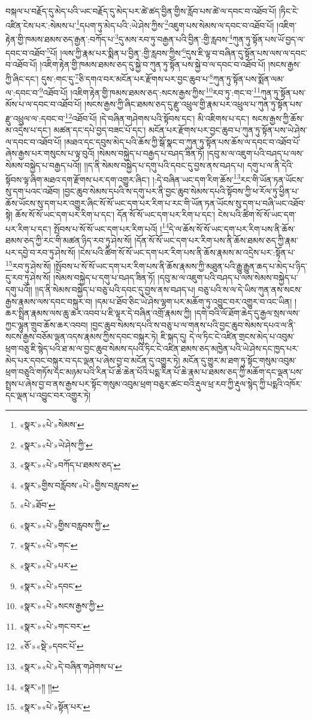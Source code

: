 བསྐལ་པ་བརྗོད་དུ་མེད་པའི་ཡང་བརྗོད་དུ་མེད་པར་ཚེ་ཚད་བྱིན་གྱིས་རློབ་པས་ཚེ་ལ་དབང་བ་འཐོབ་པོ། །ཏིང་ངེ་འཛིན་ངེས་པར་:སེམས་པ་\footnote{«སྣར་»«པེ་»སེམས་}དཔག་ཏུ་མེད་པའི་:ཡེ་ཤེས་ཀྱིས་\footnote{«སྣར་»«པེ་»ཡེ་ཤེས་ཀྱི་}འཇུག་པས་སེམས་ལ་དབང་བ་འཐོབ་པོ། །འཇིག་རྟེན་གྱི་ཁམས་ཐམས་ཅད་རྒྱན་:བཀོད་པ་\footnote{«སྣར་»«པེ་»བཀོད་པ་ཐམས་ཅད་}དུ་མས་རབ་ཏུ་བརྒྱན་པའི་བྱིན་:གྱི་རླབས་\footnote{«སྣར་»གྱིས་བརློབས་«པེ་»གྱིས་བརླབས་}ཀུན་ཏུ་སྟོན་པས་ཡོ་བྱད་ལ་དབང་བ་འཐོབ་\footnote{«པེ་»ཐོབ་}པོ། །ལས་ཀྱི་རྣམ་པར་སྨིན་པ་བྱིན་:གྱི་རླབས་ཀྱིས་\footnote{«སྣར་»«པེ་»གྱིས་བརླབས་ཀྱི་}དུས་ཇི་ལྟ་བ་བཞིན་དུ་སྟོན་པས་ལས་ལ་དབང་བ་འཐོབ་པོ། །འཇིག་རྟེན་གྱི་ཁམས་ཐམས་ཅད་དུ་སྐྱེ་བ་ཀུན་ཏུ་སྟོན་པས་སྐྱེ་བ་ལ་དབང་བ་འཐོབ་པོ། །སངས་རྒྱས་ཀྱི་ཞིང་དང་། དུས་:གང་དུ་\footnote{«སྣར་»«པེ་»གང་}ཅི་དགའ་བར་མངོན་པར་རྫོགས་པར་བྱང་ཆུབ་པ་\footnote{«སྣར་»«པེ་»པར་}ཀུན་ཏུ་སྟོན་པས་སྨོན་ལམ་ལ་:དབང་བ་\footnote{«སྣར་»«པེ་»དབང་}འཐོབ་པོ། །འཇིག་རྟེན་གྱི་ཁམས་ཐམས་ཅད་:སངས་རྒྱས་ཀྱིས་\footnote{«སྣར་»«པེ་»སངས་རྒྱས་ཀྱི་}རབ་ཏུ་:གང་བ་\footnote{«སྣར་»«པེ་»གང་བར་}ཀུན་ཏུ་སྟོན་པས་མོས་པ་ལ་དབང་བ་འཐོབ་པོ། །སངས་རྒྱས་ཀྱི་ཞིང་ཐམས་ཅད་དུ་རྫུ་འཕྲུལ་གྱི་རྣམ་པར་འཕྲུལ་པ་ཀུན་ཏུ་སྟོན་པས་རྫུ་འཕྲུལ་ལ་:དབང་བ་\footnote{«ཅོ་»«སྡེ་»དབང་པོ་}འཐོབ་པོ། །དེ་བཞིན་གཤེགས་པའི་སྟོབས་དང་། མི་འཇིགས་པ་དང་། སངས་རྒྱས་ཀྱི་ཆོས་མ་འདྲེས་པ་དང་། མཚན་དང་དཔེ་བྱད་བཟང་པོ་དང་། མངོན་པར་རྫོགས་པར་བྱང་ཆུབ་པ་ཀུན་ཏུ་སྟོན་པས་ཡེ་ཤེས་ལ་དབང་བ་འཐོབ་པོ། །མཐའ་དང་དབུས་མེད་པའི་ཆོས་ཀྱི་སྒོ་སྣང་བ་ཀུན་ཏུ་སྟོན་པས་ཆོས་ལ་དབང་བ་འཐོབ་པོ་ཞེས་རྒྱས་པར་གསུངས་པ་ལྟ་བུའོ། །སེམས་བསྐྱེད་པ་བརྒྱད་པ་བཤད་ཟིན་ཏོ། །དབུ་མ་ལ་འཇུག་པའི་བཤད་པ་ལས་སེམས་བསྐྱེད་པ་བརྒྱད་པའོ།། །།ད་ནི་སེམས་བསྐྱེད་པ་དགུ་པའི་དབང་དུ་བྱས་ནས་བཤད་པ། དགུ་པ་ལ་ནི་དེའི་སྟོབས་ལྟ་ཞིག་མཐའ་དག་རྫོགས་པར་དག་འགྱུར་ཞིང་། །:དེ་བཞིན་ཡང་དག་རིག་ཆོས་\footnote{«སྣར་»«པེ་»དེ་བཞིན་གཤེགས་པ་}རང་གི་ཡོན་ཏན་ཡོངས་སུ་དག་པའང་འཐོབ། །བྱང་ཆུབ་སེམས་དཔའི་ས་དགུ་པར་ནི་བྱང་ཆུབ་སེམས་དཔའི་སྟོབས་ཀྱི་ཕ་རོལ་ཏུ་ཕྱིན་པ་ཆོས་ཡོངས་སུ་དག་པར་འགྱུར་ཞིང་སོ་སོ་ཡང་དག་པར་རིག་པ་རང་གི་ཡོན་ཏན་ཡོངས་སུ་དག་པ་བཞི་ཡང་འཐོབ་སྟེ། ཆོས་སོ་སོ་ཡང་དག་པར་རིག་པ་དང་། དོན་སོ་སོ་ཡང་དག་པར་རིག་པ་དང་། ངེས་པའི་ཚིག་སོ་སོ་ཡང་དག་པར་རིག་པ་དང་། སྤོབས་པ་སོ་སོ་ཡང་དག་པར་རིག་པའོ། །\footnote{«སྣར་»།། །།}དེ་ལ་ཆོས་སོ་སོ་ཡང་དག་པར་རིག་པས་ནི་ཆོས་ཐམས་ཅད་ཀྱི་རང་གི་མཚན་ཉིད་རབ་ཏུ་ཤེས་སོ། །དོན་སོ་སོ་ཡང་དག་པར་རིག་པས་ནི་ཆོས་ཐམས་ཅད་ཀྱི་རྣམ་པར་དབྱེ་བ་རབ་ཏུ་ཤེས་སོ། །ངེས་པའི་ཚིག་སོ་སོ་ཡང་དག་པར་རིག་པས་ནི་ཆོས་རྣམས་མ་འདྲེས་པར་:སྟོན་པ་\footnote{«སྣར་»«པེ་»སྟོན་པར་}རབ་ཏུ་ཤེས་སོ། །སྤོབས་པ་སོ་སོ་ཡང་དག་པར་རིག་པས་ནི་ཆོས་རྣམས་ཀྱི་མཐུན་པའི་རྒྱུ་རྒྱུན་ཆད་པ་མེད་པ་ཉིད་དུ་རབ་ཏུ་ཤེས་སོ། །སེམས་བསྐྱེད་པ་དགུ་པ་བཤད་ཟིན་ཏོ། །དབུ་མ་ལ་འཇུག་པའི་བཤད་པ་ལས་སེམས་བསྐྱེད་པ་དགུ་པའོ།། །།ད་ནི་སེམས་བསྐྱེད་པ་བཅུ་པའི་དབང་དུ་བྱས་ནས་བཤད་པ། བཅུ་པའི་ས་ལ་དེ་ཡིས་ཀུན་ནས་སངས་རྒྱས་རྣམས་ལས་དབང་བསྐུར་བ། །དམ་པ་ཐོབ་ཅིང་ཡེ་ཤེས་ལྷག་པར་མཆོག་ཏུ་འབྱུང་བར་འགྱུར་བ་འང་ཡིན། །ཆར་སྤྲིན་རྣམས་ལས་ཆུ་ཆར་འབབ་པ་ཇི་ལྟར་དེ་བཞིན་འགྲོ་རྣམས་ཀྱི། །དགེ་བའི་ལོ་ཐོག་ཆེད་དུ་རྒྱལ་སྲས་ལས་ཀྱང་ལྷུན་གྲུབ་ཆོས་ཆར་འབབ། །བྱང་ཆུབ་སེམས་དཔའི་ས་བཅུ་པ་ལ་གནས་པའི་བྱང་ཆུབ་སེམས་དཔའ་ལ་ནི་སངས་རྒྱས་བཅོམ་ལྡན་འདས་རྣམས་ཀྱིས་དབང་བསྐུར་ཏེ། ཇི་སྐད་དུ། དེ་ལ་ཏིང་ངེ་འཛིན་གྲངས་མེད་པ་འབུམ་ཕྲག་བཅུ་ཇི་སྙེད་པའི་ཐ་མ་ལ་བྱང་ཆུབ་སེམས་དཔའི་ཏིང་ངེ་འཛིན་ཐམས་ཅད་མཁྱེན་པའི་ཡེ་ཤེས་དང་ཁྱད་པར་མེད་པར་དབང་བསྐུར་བ་དང་ལྡན་པ་ཞེས་བྱ་བ་མངོན་དུ་འགྱུར་ཏེ། མངོན་དུ་གྱུར་མ་ཐག་ཏུ་སྟོང་གསུམ་འབུམ་ཕྲག་བཅུའི་གཏོས་དང་མཉམ་པའི་རིན་པོ་ཆེ་ཆེན་པོའི་པདྨ་རིན་པོ་ཆེ་རྣམ་པ་ཐམས་ཅད་ཀྱི་མཆོག་དང་ལྡན་པས་སྤྲས་པ་ཞེས་བྱ་བ་ནས་རྒྱས་པར་སྟོང་གསུམ་འབུམ་ཕྲག་བཅུར་ཚང་བའི་རྡུལ་ཕྲ་རབ་ཀྱི་རྡུལ་སྙེད་ཀྱི་པདྨའི་འཁོར་དང་ལྡན་པ་འབྱུང་བར་འགྱུར་ཏེ། 